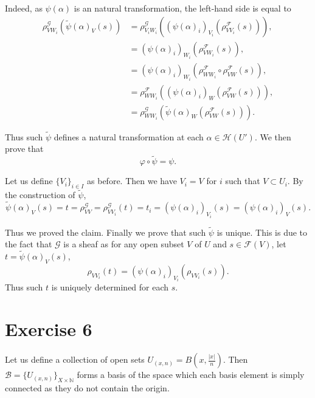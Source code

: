 \documentclass{article}
\begin{document}
Indeed, as $\psi(\alpha)$ is an natural transformation, the left-hand side is equal to
\begin{align*}
\rho_{VW_i}^{\mathcal{G}}(\tilde{\psi}(\alpha)_V(s))&=\rho_{V_iW_i}^{\mathcal{G}}((\psi(\alpha)_i)_{V_i}(\rho^{\mathcal{F}}_{VV_i}(s))),\\
&=(\psi(\alpha)_i)_{W_i}(\rho^{\mathcal{F}}_{VW_i}(s)),\\
&=(\psi(\alpha)_i)_{W_i}(\rho^{\mathcal{F}}_{WW_i}\circ\rho^{\mathcal{F}}_{VW}(s)),\\
&=\rho^{\mathcal{F}}_{WW_i}((\psi(\alpha)_i)_{W}(\rho^{\mathcal{F}}_{VW}(s))),\\
&=\rho^{\mathcal{G}}_{WW_i}(\tilde{\psi}(\alpha)_{W}(\rho^{\mathcal{F}}_{VW}(s))).
\end{align*}

Thus such $\tilde{\psi}$ defines a natural transformation at each $\alpha\in\mathcal{H}(U')$. We then prove that 
\begin{equation*}
\varphi\circ\tilde{\psi}=\psi.
\end{equation*}

Let us define $\{V_i\}_{i\in I}$ as before. Then we have $V_i = V$ for $i$ such that $V\subset U_i$. By the construction of $\tilde{\psi}$,
\begin{equation*}
\tilde{\psi}(\alpha)_V(s) = t=\rho^{\mathcal{G}}_{VV}=\rho^{\mathcal{G}}_{VV_i}(t) = t_i = (\psi(\alpha)_i)_{V_i}(s)=(\psi(\alpha)_i)_{V}(s).
\end{equation*}

Thus we proved the claim. Finally we prove that such $\tilde{\psi}$ is unique. This is due to the fact that $\mathcal{G}$ is a sheaf as for any open subset $V$ of $U$ and $s\in\mathcal{F}(V)$, let $t=\tilde{\psi}(\alpha)_V(s)$, 
\begin{equation*}
\rho_{VV_i}(t) = (\psi(\alpha)_i)_{V_i}(\rho_{VV_i}(s)).
\end{equation*}
Thus such $t$ is uniquely determined for each $s$.

\section{Exercise 6}

Let us define a collection of open sets $U_{(x,n)} = B(x,{\frac {|x|} n})$. Then $\mathcal{B}=\{U_{(x,n)}\}_{X\times\mathbb{N}}$ forms a basis of the space which each basis element is simply connected as they do not contain the origin.\\
\end{document}
